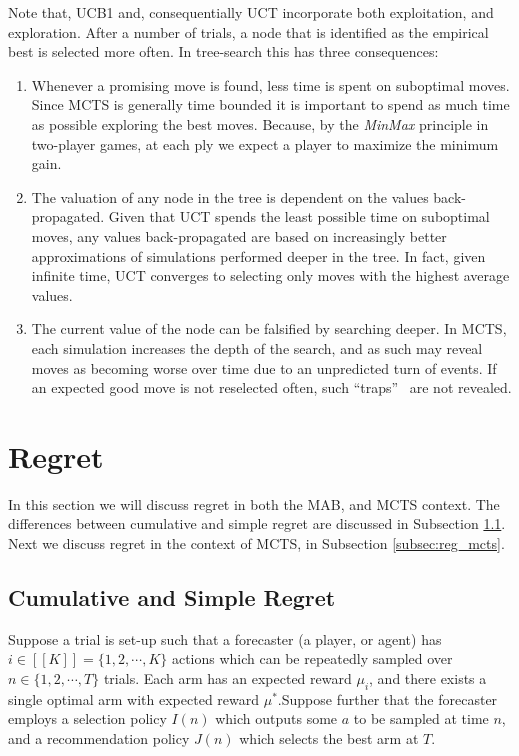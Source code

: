 \documentclass[a4paper]{llncs}
\begin{document}
Note that, UCB1 and, consequentially UCT incorporate both exploitation, and exploration. After a number of trials, a node that is identified as the empirical best is selected more often. In tree-search this has three consequences:
\begin{enumerate} 

\item Whenever a promising move is found, less time is spent on suboptimal moves. Since MCTS is generally time bounded it is important to spend as much time as possible exploring the best moves. Because, by the \emph{MinMax} principle in two-player games, at each ply we expect a player to maximize the minimum gain.

\item The valuation of any node in the tree is dependent on the values back-propagated. Given that UCT spends the least possible time on suboptimal moves, any values back-propagated are based on increasingly better approximations of simulations performed deeper in the tree. In fact, given infinite time, UCT converges to selecting only moves with the highest average values.

\item The current value of the node can be falsified by searching deeper. In MCTS, each simulation increases the depth of the search, and as such may reveal moves as becoming worse over time due to an unpredicted turn of events. If an expected good move is not reselected often, such ``traps''~\cite{Ramanujan2010a} are not revealed.

\end{enumerate}

\section{Regret}
\label{sec:regret}
In this section we will discuss regret in both the MAB, and MCTS context. The differences between cumulative and simple regret are discussed in Subsection \ref{subsec:cumsimregret}. Next we discuss regret in the context of MCTS, in Subsection \ref{subsec:reg_mcts}.

\subsection{Cumulative and Simple Regret}
\label{subsec:cumsimregret}

Suppose a trial is set-up such that a forecaster (a player, or agent) has $i \in [[K]] = \{ 1, 2, \cdots , K \}$ actions which can be repeatedly sampled over $n \in \{ 1, 2, \cdots, T \}$ trials. Each arm has an expected reward $\mu_i$, and there exists a single optimal arm with expected reward $\mu^*$.Suppose further that the forecaster employs a selection policy $I(n)$ which outputs some $a$ to be sampled at time $n$, and a recommendation policy $J(n)$ which selects the best arm at $T$.
\end{document}
